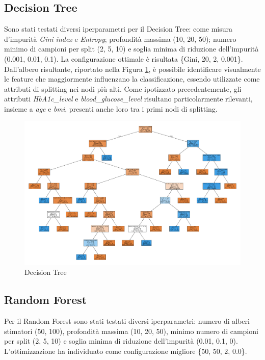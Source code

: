 \documentclass[conference]{IEEEtran}
\begin{document}
\subsection{Decision Tree}
Sono stati testati diversi iperparametri per il Decision Tree: come misura d’impurità \textit{Gini index} e \textit{Entropy}; profondità massima (10, 20, 50); numero minimo di campioni per split (2, 5, 10) e soglia minima di riduzione dell’impurità (0.001, 0.01, 0.1). La configurazione ottimale è risultata \{Gini, 20, 2, 0.001\}. Dall’albero risultante, riportato nella Figura \ref{tree}, è possibile identificare visualmente le feature che maggiormente influenzano la classificazione, essendo utilizzate come attributi di splitting nei nodi più alti. Come ipotizzato precedentemente, gli attributi \emph{HbA1c\_level} e \emph{blood\_glucose\_level} risultano particolarmente rilevanti, insieme a \emph{age} e \emph{bmi}, presenti anche loro tra i primi nodi di splitting.


\begin{figure} [H]
    \centering
    \includegraphics[width=\linewidth]{DecisionTree.pdf}
    \caption{Decision Tree}
    \label{tree}
\end{figure}

\subsection{Random Forest}
Per il Random Forest sono stati testati diversi iperparametri: numero di alberi stimatori (50, 100), profondità massima (10, 20, 50), minimo numero di campioni per split (2, 5, 10) e soglia minima di riduzione dell’impurità (0.01, 0.1, 0). L’ottimizzazione ha individuato come configurazione migliore \{50, 50, 2, 0.0\}.
\end{document}
